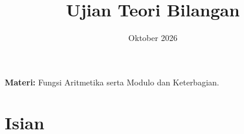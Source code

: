 \documentclass[12pt]{scrartcl}
\title{Ujian Teori Bilangan}
\date{Oktober 2026}
\begin{document}
\maketitle

\renewcommand*\contentsname{Daftar Isi}
\tableofcontents

\newpage
\textbf{Materi:} Fungsi Aritmetika serta Modulo dan Keterbagian.


\section{Isian}
\end{document}
